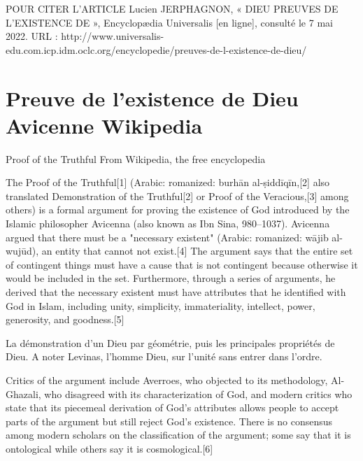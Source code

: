 POUR CITER L’ARTICLE
Lucien JERPHAGNON, « DIEU PREUVES DE L'EXISTENCE DE », Encyclopædia Universalis [en ligne], consulté le 7 mai 2022. URL : http://www.universalis-edu.com.icp.idm.oclc.org/encyclopedie/preuves-de-l-existence-de-dieu/


\section{Preuve de l'existence de Dieu Avicenne Wikipedia}

Proof of the Truthful
From Wikipedia, the free encyclopedia



The Proof of the Truthful[1] (Arabic:  romanized: burhān al-ṣiddīqīn,[2] also translated Demonstration of the Truthful[2] or Proof of the Veracious,[3] among others) is a formal argument for proving the existence of God introduced by the Islamic philosopher Avicenna (also known as Ibn Sina, 980–1037). Avicenna argued that there must be a "necessary existent" (Arabic: romanized: wājib al-wujūd), an entity that cannot not exist.[4] The argument says that the entire set of contingent things must have a cause that is not contingent because otherwise it would be included in the set. Furthermore, through a series of arguments, he derived that the necessary existent must have attributes that he identified with God in Islam, including unity, simplicity, immateriality, intellect, power, generosity, and goodness.[5]

\begin{Synthesis}
La démonstration d'un Dieu par géométrie, puis les principales propriétés de Dieu.
A noter Levinas, l'homme Dieu, sur l'unité sans entrer dans l'ordre.
\end{Synthesis}
 
Critics of the argument include Averroes, who objected to its methodology, Al-Ghazali, who disagreed with its characterization of God, and modern critics who state that its piecemeal derivation of God's attributes allows people to accept parts of the argument but still reject God's existence. There is no consensus among modern scholars on the classification of the argument; some say that it is ontological while others say it is cosmological.[6]



